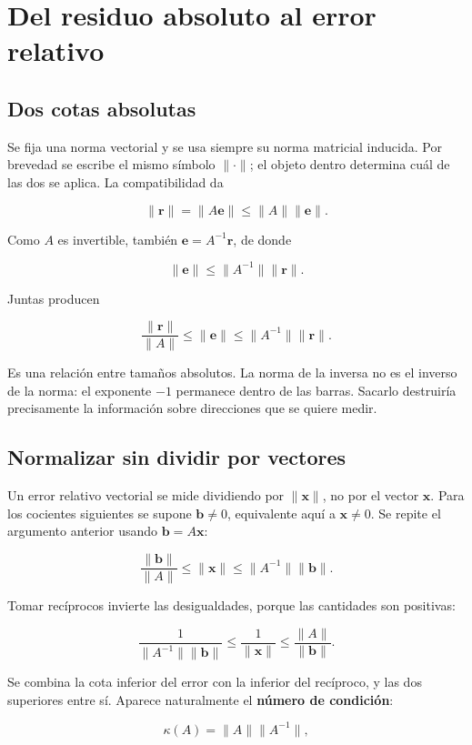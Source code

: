 \documentclass[12pt,a4paper]{article}
\begin{document}
\section{Del residuo absoluto al error relativo}

\subsection{Dos cotas absolutas}

Se fija una norma vectorial y se usa siempre su norma matricial inducida. Por brevedad se escribe el mismo símbolo $\|\cdot\|$; el objeto dentro determina cuál de las dos se aplica. La compatibilidad da

\[
\|\mathbf r\|=\|A\mathbf e\|\le\|A\|\|\mathbf e\|.
\]

Como $A$ es invertible, también $\mathbf e=A^{-1}\mathbf r$, de donde

\[
\|\mathbf e\|\le\|A^{-1}\|\|\mathbf r\|.
\]

Juntas producen

\[
\frac{\|\mathbf r\|}{\|A\|}
\le\|\mathbf e\|\le\|A^{-1}\|\|\mathbf r\|.
\]

Es una relación entre tamaños absolutos. La norma de la inversa no es el inverso de la norma: el exponente $-1$ permanece dentro de las barras. Sacarlo destruiría precisamente la información sobre direcciones que se quiere medir.

\subsection{Normalizar sin dividir por vectores}

Un error relativo vectorial se mide dividiendo por $\|\mathbf x\|$, no por el vector $\mathbf x$. Para los cocientes siguientes se supone $\mathbf b\ne0$, equivalente aquí a $\mathbf x\ne0$. Se repite el argumento anterior usando $\mathbf b=A\mathbf x$:

\[
\frac{\|\mathbf b\|}{\|A\|}
\le\|\mathbf x\|\le\|A^{-1}\|\|\mathbf b\|.
\]

Tomar recíprocos invierte las desigualdades, porque las cantidades son positivas:

\[
\frac{1}{\|A^{-1}\|\|\mathbf b\|}
\le\frac{1}{\|\mathbf x\|}
\le\frac{\|A\|}{\|\mathbf b\|}.
\]

Se combina la cota inferior del error con la inferior del recíproco, y las dos superiores entre sí. Aparece naturalmente el \textbf{número de condición}:

\[
\boxed{\kappa(A)=\|A\|\|A^{-1}\|},
\]
\end{document}
